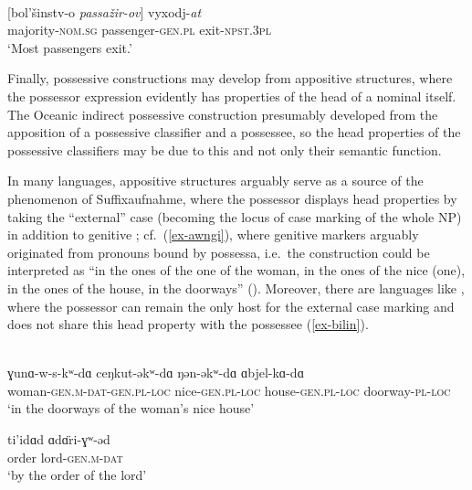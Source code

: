\documentclass[output=paper,nobabel,draftmode  ,colorlinks, citecolor=brown]{langscibook}
\begin{document}
\ea\label{ex-russian} 
\\
\gll {}[bol’šinstv-o \emph{passažir-ov}] vyxodj-\emph{at}\\ 
     \spacebr{}majority-\textsc{nom.sg}	passenger-\textsc{gen.pl}	exit-\textsc{npst.3pl}	\\
\glt `Most passengers exit.'
\z

\noindent Finally, possessive constructions may develop from appositive structures, where the possessor
expression evidently has properties of the head of a nominal itself. The Oceanic indirect possessive
construction presumably developed from the apposition of a possessive classifier and a possessee, so
the head properties of the possessive classifiers may be due to this and not only their semantic
function. 

In many languages, appositive structures arguably serve as a source of the phenomenon of Suffixaufnahme, where the possessor displays head properties by taking the ``external'' case (becoming the locus of case marking of the whole NP) in addition to genitive \citep{Plank1995}; cf.\ (\ref{ex-awngi}), where genitive markers arguably originated from pronouns bound by possessa, i.e.\ the construction could be interpreted as ``in the ones of the one of the woman, in the ones of the nice (one), in the ones of the house, in the doorways'' (\cite{Aristar1995}). Moreover, there are languages like , where the possessor can remain the only host for the external case marking and does not share this head property with the possessee (\ref{ex-bilin}). 


\ea\label{ex-awngi}
\\
\gll ​ɣ​unɑ​-w-s-kʷ-dɑ​ ceŋ​kut-əkʷ-dɑ​ ŋ​ən-əkʷ-dɑ​ ɑ​bjel-kɑ​-dɑ​\\ 
     woman-\textsc{gen.m-dat-gen.pl-loc}   nice-\textsc{gen.pl-loc} house-\textsc{gen.pl-loc} doorway-\textsc{pl-loc}\\
\glt `in the doorways of the woman's nice house'
\z

\ea\label{ex-bilin} 
\gll ti'idɑ​d ɑ​d\"ɑ​ri-​ɣ​ʷ-əd\\ 
     order   lord-\textsc{gen.m-dat}\\
\glt `by the order of the lord'
\z
\end{document}

